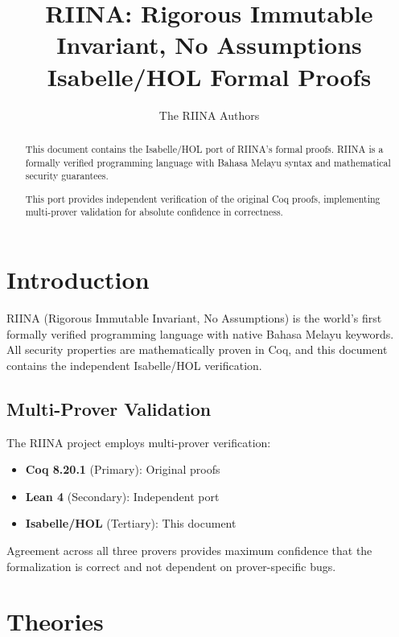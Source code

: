\documentclass[11pt,a4paper]{article}
\title{RIINA: Rigorous Immutable Invariant, No Assumptions\\
       Isabelle/HOL Formal Proofs}
\author{The RIINA Authors}
\begin{document}
\maketitle

\begin{abstract}
This document contains the Isabelle/HOL port of RIINA's formal proofs.
RIINA is a formally verified programming language with Bahasa Melayu syntax
and mathematical security guarantees.

This port provides independent verification of the original Coq proofs,
implementing multi-prover validation for absolute confidence in correctness.
\end{abstract}

\tableofcontents

\section{Introduction}

RIINA (Rigorous Immutable Invariant, No Assumptions) is the world's first
formally verified programming language with native Bahasa Melayu keywords.
All security properties are mathematically proven in Coq, and this document
contains the independent Isabelle/HOL verification.

\subsection{Multi-Prover Validation}

The RIINA project employs multi-prover verification:
\begin{itemize}
\item \textbf{Coq 8.20.1} (Primary): Original proofs
\item \textbf{Lean 4} (Secondary): Independent port
\item \textbf{Isabelle/HOL} (Tertiary): This document
\end{itemize}

Agreement across all three provers provides maximum confidence that the
formalization is correct and not dependent on prover-specific bugs.

\section{Theories}


\end{document}
